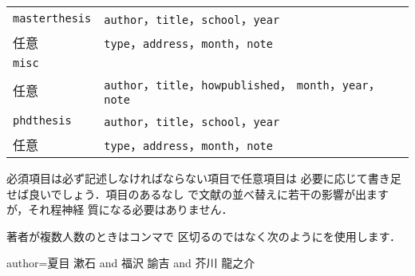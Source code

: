 \begin{table}[htbp]
\begin{center}
\begin{tabular}{lp{50ex}}
%
\texttt{masterthesis}  & 
 \texttt{author}，\texttt{title}，\texttt{school}，\texttt{year}\\
任意                & 
 \texttt{type}，\texttt{address}，\texttt{month}，\texttt{note} \\
\hline
%
\texttt{misc}          & \\
任意                & 
 \texttt{author}，\texttt{title}，\texttt{howpublished}，
 \texttt{month}，\texttt{year}，\texttt{note} \\
\hline
%
\texttt{phdthesis}  & 
 \texttt{author}，\texttt{title}，\texttt{school}，\texttt{year}\\
任意                &
 \texttt{type}，\texttt{address}，\texttt{month}，\texttt{note} \\
\hline
\end{tabular}
\end{center}
\end{table}
%
必須項目は必ず記述しなければならない項目で任意項目は
必要に応じて書き足せば良いでしょう．項目のあるなし
で文献の並べ替えに若干の影響が出ますが，それ程神経
質になる必要はありません．


著者が複数人数のときはコンマで
区切るのではなく次のようにを使用します．

\begin{InText}
author={夏目 漱石 and 福沢 諭吉 and 芥川 龍之介}
\end{InText}

